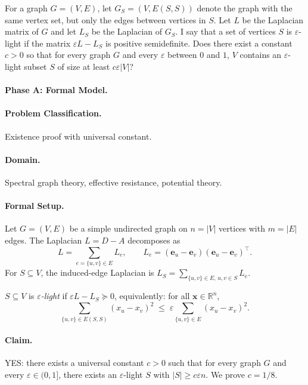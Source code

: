 
For a graph $G = (V, E)$, let $G_S = (V, E(S, S))$ denote the graph with the
same vertex set, but only the edges between vertices in $S$. Let $L$ be the
Laplacian matrix of $G$ and let $L_S$ be the Laplacian of $G_S$. I say that a
set of vertices $S$ is $\varepsilon$-light if the matrix $\varepsilon L - L_S$
is positive semidefinite. Does there exist a constant $c > 0$ so that for every
graph $G$ and every $\varepsilon$ between $0$ and $1$, $V$ contains an
$\varepsilon$-light subset $S$ of size at least $c\varepsilon|V|$?


\paragraph{Phase A: Formal Model.}

\paragraph{Problem Classification.} Existence proof with universal constant.

\paragraph{Domain.} Spectral graph theory, effective resistance, potential theory.

\paragraph{Formal Setup.}
Let $G = (V, E)$ be a simple undirected graph on $n = |V|$ vertices with
$m = |E|$ edges.  The Laplacian $L = D - A$ decomposes as
\[
  L = \sum_{e = \{u,v\} \in E} L_e,
  \qquad L_e = (\mathbf{e}_u - \mathbf{e}_v)(\mathbf{e}_u - \mathbf{e}_v)^\top.
\]
For $S \subseteq V$, the induced-edge Laplacian is
$L_S = \sum_{\{u,v\} \in E,\, u,v \in S} L_e$.

\begin{definition}\label{def:p6-light}
$S \subseteq V$ is \emph{$\varepsilon$-light} if $\varepsilon L - L_S \succeq 0$,
equivalently: for all $\mathbf{x} \in \mathbb{R}^n$,
\[
  \sum_{\{u,v\} \in E(S,S)} (x_u - x_v)^2
  \;\leq\; \varepsilon \sum_{\{u,v\} \in E} (x_u - x_v)^2.
\]
\end{definition}

\paragraph{Claim.} YES: there exists a universal constant $c > 0$ such that
for every graph $G$ and every $\varepsilon \in (0,1]$, there exists an
$\varepsilon$-light $S$ with $|S| \geq c\varepsilon n$.  We prove $c = 1/8$.

